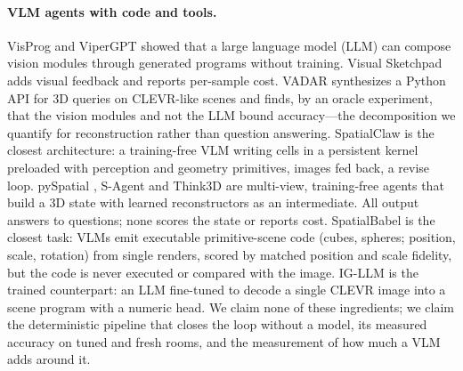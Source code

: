 \documentclass[10pt,a4paper]{article}
\begin{document}
\paragraph{VLM agents with code and tools.}
VisProg \citep{gupta2022visual} and ViperGPT \citep{surs2023vipergpt} showed that a large language model (LLM) can compose vision modules through generated programs without training. Visual Sketchpad \citep{hu2024visual} adds visual feedback and reports per-sample cost. VADAR \citep{marsili2025visual} synthesizes a Python API for 3D queries on CLEVR-like scenes and finds, by an oracle experiment, that the vision modules and not the LLM bound accuracy---the decomposition we quantify for reconstruction rather than question answering. SpatialClaw \citep{cho2026spatialclaw} is the closest architecture: a training-free VLM writing cells in a persistent kernel preloaded with perception and geometry primitives, images fed back, a revise loop. pySpatial \citep{luo2026pyspatial}, S-Agent \citep{dai2026s} and Think3D \citep{zhang2026think3d} are multi-view, training-free agents that build a 3D state with learned reconstructors as an intermediate. All output answers to questions; none scores the state or reports cost. SpatialBabel \citep{liu20263d} is the closest task: VLMs emit executable primitive-scene code (cubes, spheres; position, scale, rotation) from single renders, scored by matched position and scale fidelity, but the code is never executed or compared with the image. IG-LLM \citep{kulits2024re} is the trained counterpart: an LLM fine-tuned to decode a single CLEVR image into a scene program with a numeric head. We claim none of these ingredients; we claim the deterministic pipeline that closes the loop without a model, its measured accuracy on tuned and fresh rooms, and the measurement of how much a VLM adds around it.
\end{document}
